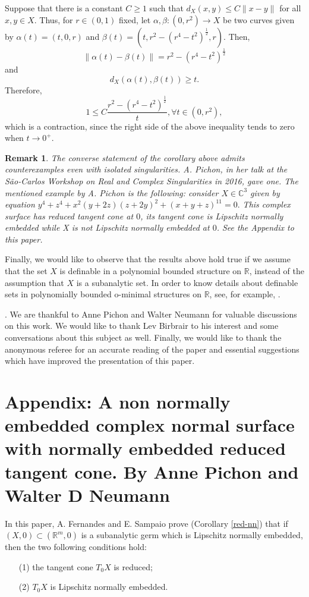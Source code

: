 \documentclass{amsart}
\newtheorem{remark}[theorem]{Remark}
\newcommand{\R}{\mathbb{R}}
\newcommand{\C}{\mathbb{C}}
\begin{document}
Suppose that there is a constant $C\geq 1$ such that $d_X(x,y)\leq C\|x-y\|$ for all $x,y\in X$. Thus, for $r\in (0,1)$ fixed, let $\alpha, \beta:(0,r^2)\to X$ be two curves given by $\alpha(t)=(t,0,r)$ and $\beta(t)=(t,r^2-(r^4-t^2)^{\frac{1}{2}},r)$. 
Then,
$$
\|\alpha(t)-\beta(t)\|=r^2-(r^4-t^2)^{\frac{1}{2}}
$$
and
$$
d_X(\alpha(t),\beta(t))\geq t.
$$
Therefore, 
$$
1\leq C\frac{r^2-(r^4-t^2)^{\frac{1}{2}}}{t}, \forall t\in (0,r^2),
$$
which is a contraction, since the right side of the above inequality tends to zero when $t\to 0^+$.

\begin{remark}
{\rm  The converse statement of the corollary above admits counterexamples even with isolated singularities. A. Pichon, in her talk at the S\~ao-Carlos Workshop on Real and Complex Singularities in 2016, gave one. The mentioned example by A. Pichon is the following: consider $X \in \C^3$ given by  equation $y^4+z^4+x^2(y+2z)(z+2y)^2+(x+y+z)^{11} = 0.$ This complex surface has reduced tangent cone at $0$, its  tangent cone is Lipschitz normally embedded while X is not Lipschitz normally embedded at $0$. See the Appendix to this paper.}
\end{remark}

Finally, we would like to observe that the results above hold true if we assume that the set $X$ is definable in a polynomial bounded structure on $\R$, instead  of the assumption that $X$ is a subanalytic set. In order to know details about definable sets in polynomially bounded o-minimal structures on $\R$, see, for example, \cite{Dries:1998}.

.  We are thankful to Anne Pichon and Walter Neumann for valuable discussions on this work. We would like to thank Lev Birbrair to his interest and some conversations about this subject as well. Finally, we would like to thank the anonymous referee for an accurate reading of the paper and essential suggestions which have improved the presentation of this paper.


\section{Appendix: A non normally embedded complex normal surface with normally embedded reduced tangent cone. By Anne Pichon and Walter D Neumann}

In this paper, A. Fernandes and E. Sampaio prove (Corollary
\ref{red-nn}) that if $(X,0) \subset (\mathbb R^m,0)$ is a subanalytic germ which is
Lipschitz normally embedded, then the two following conditions
hold:
\begin{itemize}
\item[(1)]the tangent cone $T_0X$ is reduced;
\item[(2)]$T_0X$ is Lipschitz normally embedded.
\end{itemize}
\end{document}
